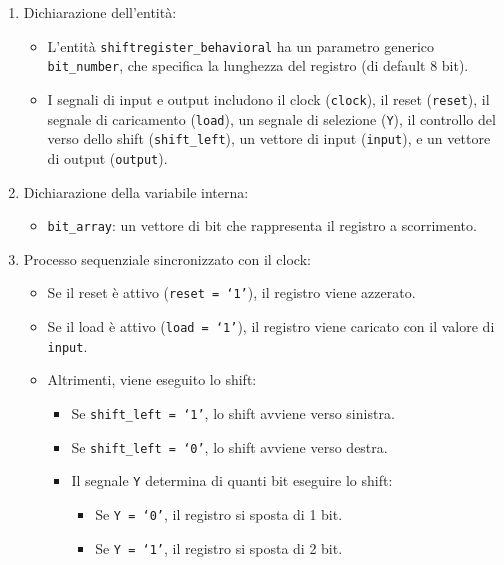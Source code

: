 \begin{enumerate}
    \item Dichiarazione dell'entità:
    \begin{itemize}
        \item L'entità \texttt{shiftregister\_behavioral} ha un parametro generico \texttt{bit\_number}, che specifica la lunghezza del registro (di default 8 bit).
        \item I segnali di input e output includono il clock (\texttt{clock}), il reset (\texttt{reset}), il segnale di caricamento (\texttt{load}), un segnale di selezione (\texttt{Y}), il controllo del verso dello shift (\texttt{shift\_left}), un vettore di input (\texttt{input}), e un vettore di output (\texttt{output}).
    \end{itemize}
    \item Dichiarazione della variabile interna:
    \begin{itemize}
        \item \texttt{bit\_array}: un vettore di bit che rappresenta il registro a scorrimento.
    \end{itemize}
    \item Processo sequenziale sincronizzato con il clock:
    \begin{itemize}
        \item Se il reset è attivo (\texttt{reset = `1'}), il registro viene azzerato.
        \item Se il load è attivo (\texttt{load = `1'}), il registro viene caricato con il valore di \texttt{input}.
        \item Altrimenti, viene eseguito lo shift:
        \begin{itemize}
            \item Se \texttt{shift\_left = `1'}, lo shift avviene verso sinistra.
            \item Se \texttt{shift\_left = `0'}, lo shift avviene verso destra.
            \item Il segnale \texttt{Y} determina di quanti bit eseguire lo shift:
            \begin{itemize}
                \item Se \texttt{Y = `0'}, il registro si sposta di 1 bit.
                \item Se \texttt{Y = `1'}, il registro si sposta di 2 bit.
            \end{itemize}
        \end{itemize}
    \end{itemize}
\end{enumerate}

